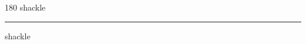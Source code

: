 
\begin{frame}
\begin{center}
\begin{turn}{180}
{\fontsize{2.5cm}{1em}\selectfont shackle}
\end{turn}
\vspace{1em}\par  
\hrule
\vspace{1em}\par  
{\fontsize{2.5cm}{1em}\selectfont shackle}
\end{center}
\end{frame}
